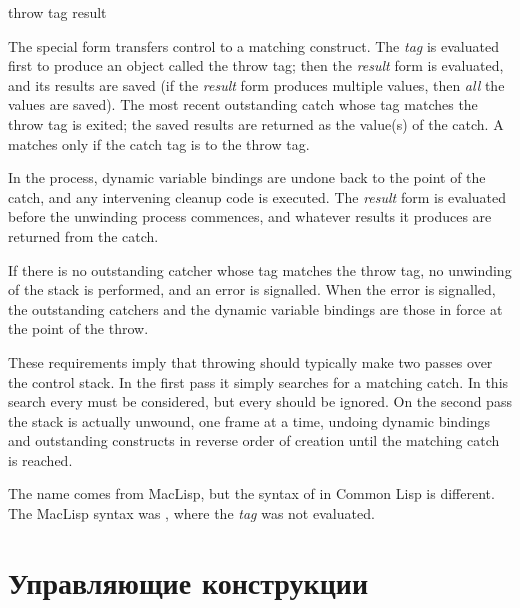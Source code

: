 \begin{defspec}
throw tag result

The  special form transfers control to a matching
 construct.
The \emph{tag} is evaluated first to produce an object
called the throw tag; then the \emph{result} form is evaluated,
and its results are saved (if the \emph{result} form produces
multiple values, then \emph{all} the values are saved).
The most recent outstanding catch whose tag matches the throw tag
is exited; the saved results are returned as the value(s) of the catch.
A  matches only if the catch tag is  to the throw tag.

In the process, dynamic variable
bindings are undone back to the point of the catch, and any intervening
 cleanup code is executed.
The \emph{result} form is evaluated before the unwinding process commences,
and whatever results it produces are returned from the catch.

If there is no outstanding catcher whose tag matches the throw tag,
no unwinding of the stack is performed, and an error is signalled.
When the error is signalled, the outstanding catchers and the dynamic
variable bindings are those in force at the point of the throw.

\beforenoterule
\begin{implementation}
These requirements imply that throwing should typically
make two passes over the control stack.  In the first pass it simply
searches for a matching catch.  In this search every 
must be considered, but every
 should be ignored.  On the second pass the stack
is actually unwound, one frame at a time, undoing dynamic bindings
and outstanding  constructs in reverse order of creation
until the matching catch is reached.
\end{implementation}

\betweennoterule

\begin{incompatibility}
The name  comes from MacLisp,
but the syntax of  in Common Lisp is different.
The MacLisp syntax was ,
where the \emph{tag} was not evaluated.
\end{incompatibility}

\afternoterule
\end{defspec}

\else

\chapter{Управляющие конструкции}
\label{CONTRL}

